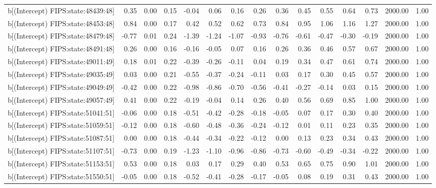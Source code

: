 \begin{table}[ht]
\begin{tabular}{rrrrrrrrrrrrrrr}
  b[(Intercept) FIPS:state:48439:48] & 0.35 & 0.00 & 0.15 & -0.04 & 0.06 & 0.16 & 0.26 & 0.36 & 0.45 & 0.55 & 0.64 & 0.73 & 2000.00 & 1.00 \\ 
  b[(Intercept) FIPS:state:48453:48] & 0.84 & 0.00 & 0.17 & 0.42 & 0.52 & 0.62 & 0.73 & 0.84 & 0.95 & 1.06 & 1.16 & 1.27 & 2000.00 & 1.00 \\ 
  b[(Intercept) FIPS:state:48479:48] & -0.77 & 0.01 & 0.24 & -1.39 & -1.24 & -1.07 & -0.93 & -0.76 & -0.61 & -0.47 & -0.30 & -0.19 & 2000.00 & 1.00 \\ 
  b[(Intercept) FIPS:state:48491:48] & 0.26 & 0.00 & 0.16 & -0.16 & -0.05 & 0.07 & 0.16 & 0.26 & 0.36 & 0.46 & 0.57 & 0.67 & 2000.00 & 1.00 \\ 
  b[(Intercept) FIPS:state:49011:49] & 0.18 & 0.01 & 0.22 & -0.39 & -0.26 & -0.11 & 0.04 & 0.19 & 0.34 & 0.47 & 0.61 & 0.74 & 2000.00 & 1.00 \\ 
  b[(Intercept) FIPS:state:49035:49] & 0.03 & 0.00 & 0.21 & -0.55 & -0.37 & -0.24 & -0.11 & 0.03 & 0.17 & 0.30 & 0.45 & 0.57 & 2000.00 & 1.00 \\ 
  b[(Intercept) FIPS:state:49049:49] & -0.42 & 0.00 & 0.22 & -0.98 & -0.86 & -0.70 & -0.56 & -0.41 & -0.27 & -0.14 & 0.03 & 0.15 & 2000.00 & 1.00 \\ 
  b[(Intercept) FIPS:state:49057:49] & 0.41 & 0.00 & 0.22 & -0.19 & -0.04 & 0.14 & 0.26 & 0.40 & 0.56 & 0.69 & 0.85 & 1.00 & 2000.00 & 1.00 \\ 
  b[(Intercept) FIPS:state:51041:51] & -0.06 & 0.00 & 0.18 & -0.51 & -0.42 & -0.28 & -0.18 & -0.05 & 0.07 & 0.17 & 0.30 & 0.40 & 2000.00 & 1.00 \\ 
  b[(Intercept) FIPS:state:51059:51] & -0.12 & 0.00 & 0.18 & -0.60 & -0.48 & -0.36 & -0.24 & -0.12 & 0.01 & 0.11 & 0.23 & 0.35 & 2000.00 & 1.00 \\ 
  b[(Intercept) FIPS:state:51087:51] & 0.00 & 0.00 & 0.18 & -0.44 & -0.34 & -0.22 & -0.12 & 0.00 & 0.13 & 0.23 & 0.34 & 0.43 & 2000.00 & 1.00 \\ 
  b[(Intercept) FIPS:state:51107:51] & -0.73 & 0.00 & 0.19 & -1.23 & -1.10 & -0.96 & -0.86 & -0.73 & -0.60 & -0.49 & -0.34 & -0.22 & 2000.00 & 1.00 \\ 
  b[(Intercept) FIPS:state:51153:51] & 0.53 & 0.00 & 0.18 & 0.03 & 0.17 & 0.29 & 0.40 & 0.53 & 0.65 & 0.75 & 0.90 & 1.01 & 2000.00 & 1.00 \\ 
  b[(Intercept) FIPS:state:51550:51] & -0.05 & 0.00 & 0.18 & -0.52 & -0.41 & -0.28 & -0.17 & -0.05 & 0.08 & 0.19 & 0.31 & 0.43 & 2000.00 & 1.00 \\ 

\end{tabular}
\end{table}
